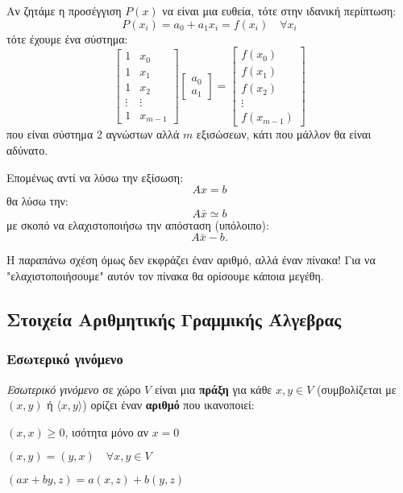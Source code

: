\documentclass[11pt,a4paper,notitlepage,fleqn]{article}
\begin{document}
	Αν ζητάμε η προσέγγιση \( P(x) \) να είναι μια ευθεία, τότε στην
	ιδανική περίπτωση:
	\[
	P(x_i) = a_0 + a_1x_i = f(x_i) \quad \forall x_i
	\]
	τότε έχουμε ένα σύστημα:
	\[
	\left[
	\begin{matrix}
	1 & x_0 \\ 1 & x_1 \\ 1 & x_2 \\ \vdots & \vdots \\ 1 & x_{m-1}
	\end{matrix}
	\right] \left[
	\begin{matrix}
	a_0 \\ a_1
	\end{matrix}
	\right] = \left[
	\begin{matrix}
	f(x_0) \\ f(x_1) \\ f(x_2) \\ \vdots \\ f(x_{m-1})
	\end{matrix}
	\right]
	\]
	που είναι σύστημα 2 αγνώστων αλλά \( m \) εξισώσεων, κάτι που μάλλον
	θα είναι αδύνατο.
	
	Επομένως αντί να λύσω την εξίσωση:
	\[
	Ax = b
	\]
	θα λύσω την:
	\[
	A\bar x \simeq b
	\]
	με σκοπό να ελαχιστοποιήσω την απόσταση (υπόλοιπο):
	\[
	A\bar x -b.
	\]
	
	Η παραπάνω σχέση όμως δεν εκφράζει έναν αριθμό, αλλά έναν πίνακα!
	Για να "ελαχιστοποιήσουμε" αυτόν τον πίνακα θα ορίσουμε κάποια
	μεγέθη.
	
	\subsection{Στοιχεία Αριθμητικής Γραμμικής Άλγεβρας}
	\subsubsection{Εσωτερικό γινόμενο}
	\textit{Εσωτερικό γινόμενο} σε χώρο \( V \) είναι μια \textbf{πράξη}
	για κάθε \( x,y \in V \) 
	(συμβολίζεται με \( (x,y) \) ή \( \langle x,y \rangle \))
	ορίζει έναν \textbf{αριθμό} που ικανοποιεί:
	\begin{enumroman}
		\item \( (x,x) \geq 0 \), ισότητα μόνο αν \( x=0 \)
		\item \( (x,y) = (y,x) \quad \forall x,y\in V \)
		\item \( (ax+by,z) = a(x,z)+b(y,z) \)
	\end{enumroman}
	
\end{document}
